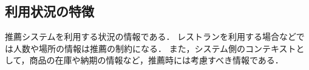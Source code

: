\subsection{利用状況の特徴}

推薦システムを利用する状況の情報である．
レストランを利用する場合などでは人数や場所の情報は推薦の制約になる\cite{tjsai:06:01,trjsai:06:01}．
また，システム側のコンテキストとして，商品の在庫や納期の情報など，推薦時には考慮すべき情報である．
